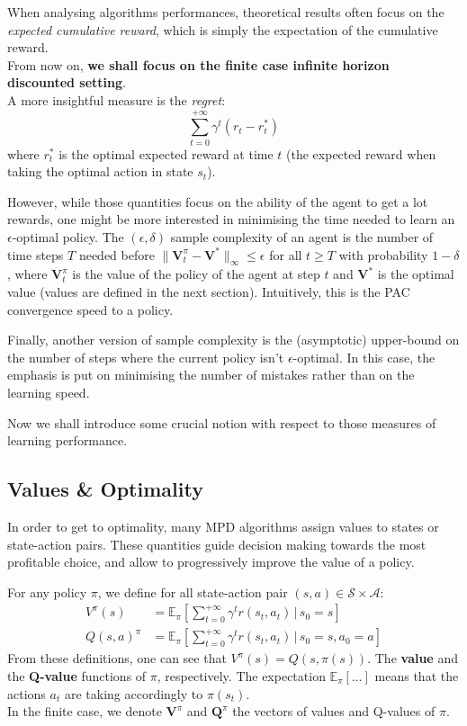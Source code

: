 When analysing algorithms performances, theoretical results often focus on the \emph{expected cumulative reward}, which is simply the expectation of the cumulative reward.\\[1.5\lineskip]

From now on, \textbf{we shall focus on the finite case infinite horizon discounted setting}.\\[1.5\lineskip]

A more insightful measure is the \emph{regret}: $$\sum_{t=0}^{+\infty} \gamma^t(r_t - r_t^*)$$where $r_t^*$ is the optimal expected reward at time $t$ (the expected reward when taking the optimal action in state $s_t$).

However, while those quantities focus on the ability of the agent to get a lot rewards, one might be more interested in minimising the time needed to learn an $\epsilon$-optimal policy. The $(\epsilon, \delta)$ sample complexity of an agent is the number of time steps $T$ needed before $\| \mathbf{V}_t^\pi - \mathbf{V}^* \|_\infty \leq \epsilon$ for all $t \geq T$ with probability $1 - \delta$, where $\mathbf{V}_t^\pi$ is the value of the policy of the agent at step $t$ and $\mathbf{V}^*$ is the optimal value (values are defined in the next section). Intuitively, this is the PAC convergence speed to a policy.

Finally, another version of sample complexity is the (asymptotic) upper-bound on the number of steps where the current policy isn't $\epsilon$-optimal. In this case, the emphasis is put on minimising the number of mistakes rather than on the learning speed.

Now we shall introduce some crucial notion with respect to those measures of learning performance.

\subsection{Values \& Optimality}
\label{subsec:MDP-values}

In order to get to optimality, many MPD algorithms assign values to states or state-action pairs. These quantities guide decision making towards the most profitable choice, and allow to progressively improve the value of a policy.

\begin{defi}
  For any policy $\pi$, we define for all state-action pair $(s, a) \in \mathcal{S}\times \mathcal{A}$:
  \begin{align*}
  V^\pi(s) &= \mathbb{E}_\pi \left[\sum_{t=0}^{+\infty} \gamma^t r(s_t, a_t) \,|\, s_0=s \right]\\
  Q(s, a)^\pi &= \mathbb{E}_\pi \left[\sum_{t=0}^{+\infty} \gamma^t r(s_t, a_t) \,|\, s_0=s, a_0=a \right]
  \end{align*}
  From these definitions, one can see that $V^\pi(s) = Q(s, \pi(s))$.
  The \textbf{value} and the \textbf{Q-value} functions of $\pi$, respectively. The expectation $\mathbb{E}_\pi[\dots]$ means that the actions $a_t$ are taking accordingly to $\pi(s_t)$.\\
  In the finite case, we denote $\mathbf{V}^\pi$ and $\mathbf{Q}^\pi$ the vectors of values and Q-values of $\pi$.
\end{defi}

